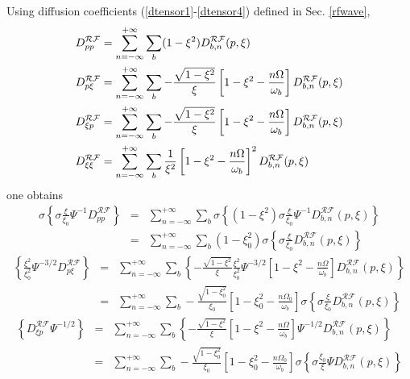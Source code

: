 Using diffusion coefficients (\ref{dtensor1}-\ref{dtensor4}) defined in Sec.
\ref{rfwave},
\begin{align}
D_{pp}^{\mathcal{RF}}& =\sum_{n=-\infty }^{+\infty }\sum_{b}(1-\xi
^{2})D_{b,n}^{\mathcal{RF}}(p,\xi ) \\
D_{p\xi }^{\mathcal{RF}}& =\sum_{n=-\infty }^{+\infty }\sum_{b}-\frac{\sqrt{
1-\xi ^{2}}}{\xi }\left[ 1-\xi ^{2}-\frac{n\Omega }{\omega _{b}}\right]
D_{b,n}^{\mathcal{RF}}(p,\xi ) \\
D_{\xi p}^{\mathcal{RF}}& =\sum_{n=-\infty }^{+\infty }\sum_{b}-\frac{\sqrt{
1-\xi ^{2}}}{\xi }\left[ 1-\xi ^{2}-\frac{n\Omega }{\omega _{b}}\right]
D_{b,n}^{\mathcal{RF}}(p,\xi ) \\
D_{\xi \xi }^{\mathcal{RF}}& =\sum_{n=-\infty }^{+\infty }\sum_{b}\frac{1}{
\xi ^{2}}\left[ 1-\xi ^{2}-\frac{n\Omega }{\omega _{b}}\right] ^{2}D_{b,n}^{%
\mathcal{RF}}(p,\xi )
\end{align}
one obtains
\begin{eqnarray}
\sigma \left\{ \sigma \frac{\xi }{\xi _{0}}\Psi ^{-1}D_{pp}^{\mathcal{RF}%
}\right\} &=&\sum_{n=-\infty }^{+\infty }\sum_{b}\sigma \left\{ (1-\xi
^{2})\sigma \frac{\xi }{\xi _{0}}\Psi ^{-1}D_{b,n}^{\mathcal{RF}}(p,\xi
)\right\}  \nonumber \\
&=&\sum_{n=-\infty }^{+\infty }\sum_{b}(1-\xi _{0}^{2})\sigma \left\{ \sigma
\frac{\xi }{\xi _{0}}D_{b,n}^{\mathcal{RF}}(p,\xi )\right\}
\end{eqnarray}
\begin{eqnarray}
\left\{ \frac{\xi ^{2}}{\xi _{0}^{2}}\Psi ^{-3/2}D_{p\xi }^{\mathcal{RF}
}\right\} &=&\sum_{n=-\infty }^{+\infty }\sum_{b}\left\{ -\frac{\sqrt{1-\xi
^{2}}}{\xi }\frac{\xi ^{2}}{\xi _{0}^{2}}\Psi ^{-3/2}\left[ 1-\xi ^{2}-\frac{
n\Omega }{\omega _{b}}\right] D_{b,n}^{\mathcal{RF}}(p,\xi )\right\}
\nonumber \\
&=&\sum_{n=-\infty }^{+\infty }\sum_{b}-\frac{\sqrt{1-\xi _{0}^{2}}}{\xi _{0}%
}\left[ 1-\xi _{0}^{2}-\frac{n\Omega _{0}}{\omega _{b}}\right] \sigma
\left\{ \sigma \frac{\xi }{\xi _{0}}D_{b,n}^{\mathcal{RF}}(p,\xi )\right\}
\end{eqnarray}
\begin{eqnarray}
\left\{ D_{\xi p}^{\mathcal{RF}}\Psi ^{-1/2}\right\} &=&\sum_{n=-\infty
}^{+\infty }\sum_{b}\left\{ -\frac{\sqrt{1-\xi ^{2}}}{\xi }\left[ 1-\xi ^{2}-%
\frac{n\Omega }{\omega _{b}}\right] \Psi ^{-1/2}D_{b,n}^{\mathcal{RF}}(p,\xi
)\right\}  \nonumber \\
&=&\sum_{n=-\infty }^{+\infty }\sum_{b}-\frac{\sqrt{1-\xi _{0}^{2}}}{\xi _{0}%
}\left[ 1-\xi _{0}^{2}-\frac{n\Omega _{0}}{\omega _{b}}\right] \sigma
\left\{ \sigma \frac{\xi _{0}}{\xi }\Psi D_{b,n}^{\mathcal{RF}}(p,\xi
)\right\}
\end{eqnarray}

